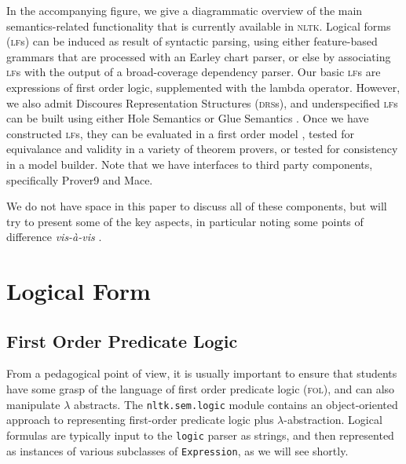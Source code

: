 \documentclass[11pt,a4paper]{article}
\newcommand{\DRS}{\textsc{drs}}
\newcommand{\FOL}{\textsc{fol}}
\newcommand{\NLTK}{\textsc{nltk}}
\newcommand{\LF}{\textsc{lf}}
\newcommand{\dhgcode}[1]{{\tt #1}}
\begin{document}
In the accompanying figure, we give a diagrammatic overview of the main
semantics-related functionality that is currently available in \NLTK.
Logical forms (\LF s) can be induced as result of syntactic parsing,
using either feature-based grammars that are processed with an Earley
chart parser, or else by associating \LF s with the output of a
broad-coverage dependency parser. Our basic \LF s are expressions of
first order logic, supplemented with the lambda operator. However, we
also admit Discoures Representation Structures (\DRS s), and
underspecified \LF s can be built using either Hole Semantics
\citep{BB} or Glue Semantics \citep{Dalrymple:1999:RRB,Dalrymple2001}. Once we have
constructed \LF s, they can be evaluated in a first order model
\citep{Klein06altw}, tested for equivalance and validity in a variety
of theorem provers, or tested for consistency in a model builder. Note
that we have interfaces to third party components, specifically
Prover9 and Mace.

We do not have space in this paper to discuss all of these components,
but will try to present some of the key aspects, in particular noting
some points of difference \textit{vis-\`a-vis} \citet{BB}.


\section{Logical Form}

\subsection{First Order Predicate Logic}
From a pedagogical point of view, it is usually important to ensure
that students have some grasp of the language of first order predicate
logic (\FOL), and can also manipulate $\lambda$ abstracts.  The
\dhgcode{nltk.sem.logic} module contains an object-oriented approach
to representing first-order predicate logic plus
$\lambda$-abstraction. Logical formulas are typically input to the
\texttt{logic} parser as strings, and then represented as instances of
various subclasses of \texttt{Expression}, as we will see shortly.



\end{document}

